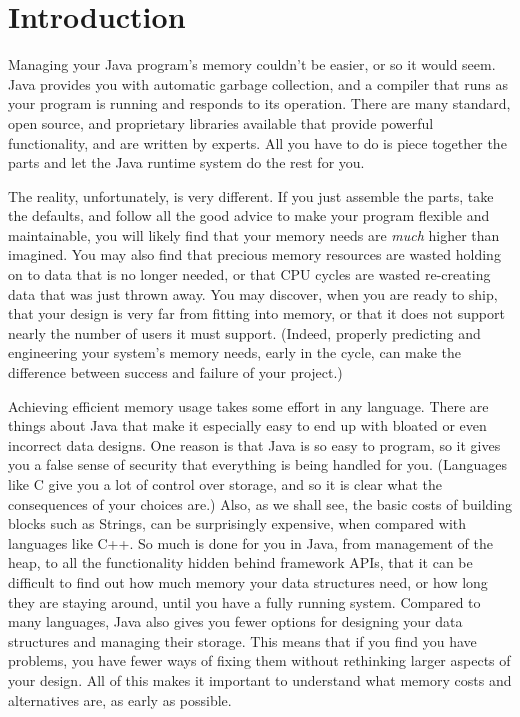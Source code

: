 
\chapter{Introduction}

Managing your Java program's memory couldn't be easier, or so it would
seem. Java provides you with automatic garbage collection, and a compiler that
runs as your program is running and responds to its operation. There are many
standard, open source, and proprietary libraries available that provide powerful
functionality, and are written by experts. All you have to do is piece together
the parts and let the Java runtime system do the rest for you.

The reality, unfortunately, is very different. If you just assemble the parts, take
the defaults, and follow all the good advice to make your
program flexible and maintainable, you will likely find that your memory needs are
\emph{much} higher than imagined. You may also find that precious memory
resources are wasted holding on to data that is no longer needed, or that
CPU cycles are wasted re-creating data that was just thrown away. 
You may discover, when you are ready to ship, that your design is very far from
fitting into memory, or that it does not support nearly the number of users it
must support. (Indeed, properly predicting and engineering 
your system's memory needs, early in the cycle, can make the
difference between success and failure of your project.)

Achieving efficient memory usage takes some effort in any language. 
There are things about Java that make it especially easy to end up with bloated
or even incorrect data designs. One reason is that Java is so easy to program,
so it gives you a false sense of security that everything is being handled for you. (Languages like C give you a
lot of control over storage, and so it is clear what
the consequences of your choices are.) Also, as we shall see,
the basic costs of building blocks such as Strings, can be surprisingly expensive,
when compared with languages like C++. So much is done for you in
Java, from management of the heap, to all the functionality hidden behind framework APIs, that it can be
difficult to find out how much memory your data structures need, or how long
they are staying around, until you have a fully running system. Compared to
many languages, Java also gives you fewer options for designing your data
structures and managing their storage. This means that if you find you have
problems, you have fewer ways of fixing them without rethinking larger aspects of your design.
All of this makes it important to understand what memory
costs and alternatives are, as early as possible.

